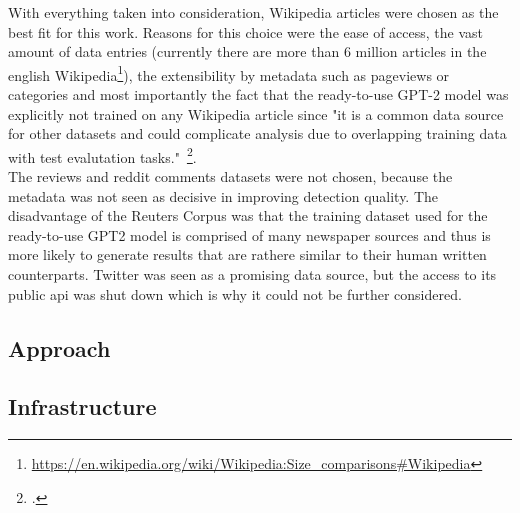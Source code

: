 With everything taken into consideration, Wikipedia articles were chosen as the best fit for this work.
Reasons for this choice were the ease of access, the vast amount of data entries (currently there are more than 6 million articles in the english Wikipedia\footnote{\url{https://en.wikipedia.org/wiki/Wikipedia:Size_comparisons\#Wikipedia}}), the extensibility by metadata such as pageviews or categories and most importantly the fact that the ready-to-use GPT-2 model was explicitly not trained on any Wikipedia article since "it is a common data source for other datasets and could complicate analysis due to overlapping training data with test evalutation tasks."~\footcite{radford2019language}. \\
The reviews and reddit comments datasets were not chosen, because the metadata was not seen as decisive in improving detection quality. The disadvantage of the Reuters Corpus was that the training dataset used for the ready-to-use GPT2 model is comprised of many newspaper sources and thus is more likely to generate results that are rathere similar to their human written counterparts. Twitter was seen as a promising data source, but the access to its public api was shut down which is why it could not be further considered.







\subsection{Approach}
\label{sec:approach}

\subsection{Infrastructure}
\label{sec:infrastructure}

